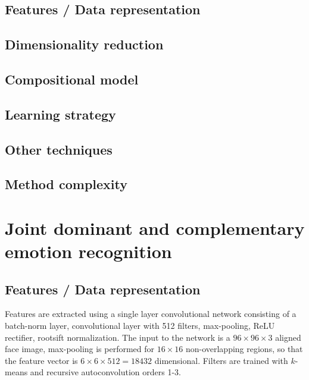 \documentclass{article}
\begin{document}
\subsection{Features / Data representation}

\subsection{Dimensionality reduction}

\subsection{Compositional model}

\subsection{Learning strategy}

\subsection{Other techniques}

\subsection{Method complexity}


\section{Joint dominant and complementary emotion recognition}
\subsection{Features / Data representation}
Features are extracted using a single layer convolutional network consisting of a batch-norm layer, convolutional layer with 512 filters, max-pooling, ReLU rectifier, rootsift normalization. The input to the network is a $96\times96\times3$ aligned face image, max-pooling is performed for $16\times16$ non-overlapping regions, so that the feature vector is $6\times6\times512=18432$ dimensional.
Filters are trained with $k$-means and recursive autoconvolution orders 1-3.
\end{document}
